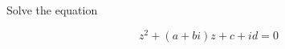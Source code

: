 Solve the equation

$$z^2+(a+bi)z+c+id=0$$

\begin{solution}\renewcommand{\qedsymbol}{}\ \\

    

\end{solution}